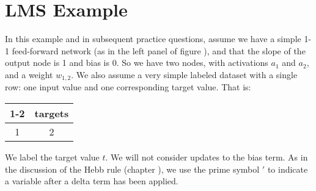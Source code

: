 %


\section{LMS Example}\label{lms_example}

In this example and in subsequent practice questions, assume we have a  simple 1-1 feed-forward network  (as in the left panel of figure ), and that the slope of the output node is 1 and bias is 0. So we have two nodes, with activations $a_1$ and $a_2$, and a weight $w_{1,2}$. We also assume a very simple labeled dataset with a single row: one input value and one corresponding target value. That is:
\begin{center}
\begin{tabular}{| c || c | }
\cline{1-2}
\multicolumn{1}{| c || }{inputs}
 & \multicolumn{1}{c|}{targets} \\
\hline
  1 & 2  \\
\hline
\end{tabular}
\end{center}
We label the target value $t$. We will not consider updates to the bias term. As in the discussion of the Hebb rule (chapter ), we use the prime symbol $'$ to indicate a variable after a delta term has been applied.

